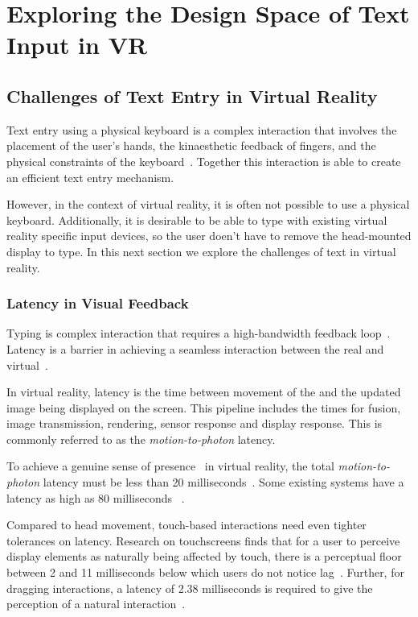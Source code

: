 \section{Exploring the Design Space of Text Input in VR}

\subsection{Challenges of Text Entry in Virtual Reality}

Text entry using a physical keyboard is a complex interaction that involves the placement of the user's hands, the kinaesthetic feedback of fingers, and the physical constraints of the keyboard~\cite{McGill:2015:DRO:2702123.2702382}.
Together this interaction is able to create an efficient text entry mechanism.

However, in the context of virtual reality, it is often not possible to use a physical keyboard.
Additionally, it is desirable to be able to type with existing virtual reality specific input devices, so the user doen't have to remove the head-mounted display to type. 
In this next section we explore the challenges of text in virtual reality.

\subsubsection{Latency in Visual Feedback}
Typing is complex interaction that requires a high-bandwidth feedback loop~\cite{McGill:2015:DRO:2702123.2702382}.
Latency is a barrier in achieving a seamless interaction between the real and virtual~\cite{leedesigning}.

In virtual reality, latency is the time between movement of the and the updated image being displayed on the screen.  
This pipeline includes the times for fusion, image transmission, rendering, sensor response and display response.
This is commonly referred to as the \textit{motion-to-photon} latency.

To achieve a genuine sense of presence~\cite{schuemie2001research} in virtual reality, the total \textit{motion-to-photon} latency must be less than 20 milliseconds~\cite{jerald2009relating,jerald2010scene,bailey2004latency}.
Some existing systems have a latency as high as 80 milliseconds ~\cite{lincoln2016motion,dallaire2016animated}.

Compared to head movement, touch-based interactions need even tighter tolerances on latency.
Research on touchscreens finds that for a user to perceive display elements as naturally being affected by touch, there is a perceptual floor between 2  and 11 milliseconds below which users do not notice lag~\cite{Jota:2013:FFE:2470654.2481317,Ng:2012:DLD:2380116.2380174}.
Further, for dragging interactions, a latency of 2.38 milliseconds is required to give the perception of a natural interaction~\cite{Jota:2013:FFE:2470654.2481317,Ng:2012:DLD:2380116.2380174}.

